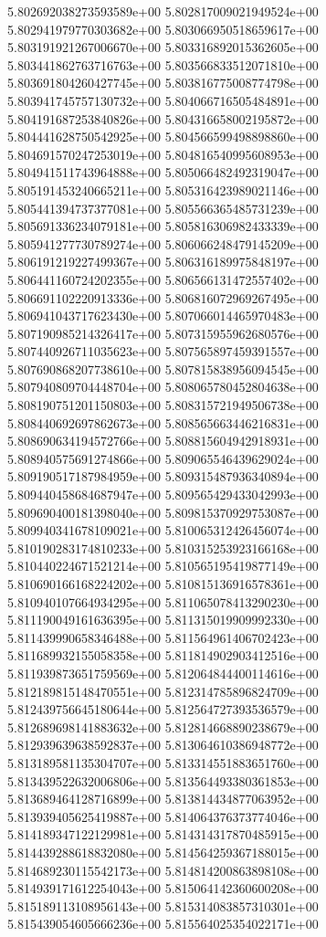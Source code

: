 5.802692038273593589e+00
5.802817009021949524e+00
5.802941979770303682e+00
5.803066950518659617e+00
5.803191921267006670e+00
5.803316892015362605e+00
5.803441862763716763e+00
5.803566833512071810e+00
5.803691804260427745e+00
5.803816775008774798e+00
5.803941745757130732e+00
5.804066716505484891e+00
5.804191687253840826e+00
5.804316658002195872e+00
5.804441628750542925e+00
5.804566599498898860e+00
5.804691570247253019e+00
5.804816540995608953e+00
5.804941511743964888e+00
5.805066482492319047e+00
5.805191453240665211e+00
5.805316423989021146e+00
5.805441394737377081e+00
5.805566365485731239e+00
5.805691336234079181e+00
5.805816306982433339e+00
5.805941277730789274e+00
5.806066248479145209e+00
5.806191219227499367e+00
5.806316189975848197e+00
5.806441160724202355e+00
5.806566131472557402e+00
5.806691102220913336e+00
5.806816072969267495e+00
5.806941043717623430e+00
5.807066014465970483e+00
5.807190985214326417e+00
5.807315955962680576e+00
5.807440926711035623e+00
5.807565897459391557e+00
5.807690868207738610e+00
5.807815838956094545e+00
5.807940809704448704e+00
5.808065780452804638e+00
5.808190751201150803e+00
5.808315721949506738e+00
5.808440692697862673e+00
5.808565663446216831e+00
5.808690634194572766e+00
5.808815604942918931e+00
5.808940575691274866e+00
5.809065546439629024e+00
5.809190517187984959e+00
5.809315487936340894e+00
5.809440458684687947e+00
5.809565429433042993e+00
5.809690400181398040e+00
5.809815370929753087e+00
5.809940341678109021e+00
5.810065312426456074e+00
5.810190283174810233e+00
5.810315253923166168e+00
5.810440224671521214e+00
5.810565195419877149e+00
5.810690166168224202e+00
5.810815136916578361e+00
5.810940107664934295e+00
5.811065078413290230e+00
5.811190049161636395e+00
5.811315019909992330e+00
5.811439990658346488e+00
5.811564961406702423e+00
5.811689932155058358e+00
5.811814902903412516e+00
5.811939873651759569e+00
5.812064844400114616e+00
5.812189815148470551e+00
5.812314785896824709e+00
5.812439756645180644e+00
5.812564727393536579e+00
5.812689698141883632e+00
5.812814668890238679e+00
5.812939639638592837e+00
5.813064610386948772e+00
5.813189581135304707e+00
5.813314551883651760e+00
5.813439522632006806e+00
5.813564493380361853e+00
5.813689464128716899e+00
5.813814434877063952e+00
5.813939405625419887e+00
5.814064376373774046e+00
5.814189347122129981e+00
5.814314317870485915e+00
5.814439288618832080e+00
5.814564259367188015e+00
5.814689230115542173e+00
5.814814200863898108e+00
5.814939171612254043e+00
5.815064142360600208e+00
5.815189113108956143e+00
5.815314083857310301e+00
5.815439054605666236e+00
5.815564025354022171e+00
